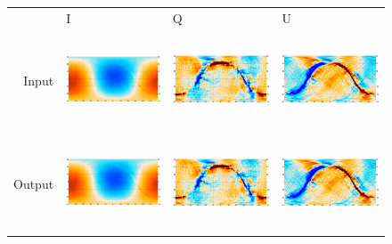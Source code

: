 \documentclass{article}
\begin{document}
\begin{figure}
	\centering
	\hspace*{-15mm}\begin{tabular}{rm{56mm}m{54.4mm}m{56mm}}
		& \hspace{32mm}I & \hspace{32mm}Q & \hspace{32mm}U \\
		Input &
		\includegraphics[height=28mm,clip,trim=0 8mm 7.5mm 0]{plots/std_sb_map_0.png} &
		\includegraphics[height=28mm,clip,trim=7.5mm 8mm 7.5mm 0]{plots/std_sb_map_1.png} &
		\includegraphics[height=28mm,clip,trim=7.5mm 8mm 0 0]{plots/std_sb_map_2.png} \\
		Output &
		\includegraphics[height=28mm,clip,trim=0 8mm 7.5mm 0]{plots/std_sb_map_0.png} &
		\includegraphics[height=28mm,clip,trim=7.5mm 8mm 7.5mm 0]{plots/std_sb_map_1.png} &
		\includegraphics[height=28mm,clip,trim=7.5mm 8mm 0 0]{plots/std_sb_map_2.png} \\

\end{tabular}
\end{figure}
\end{document}
